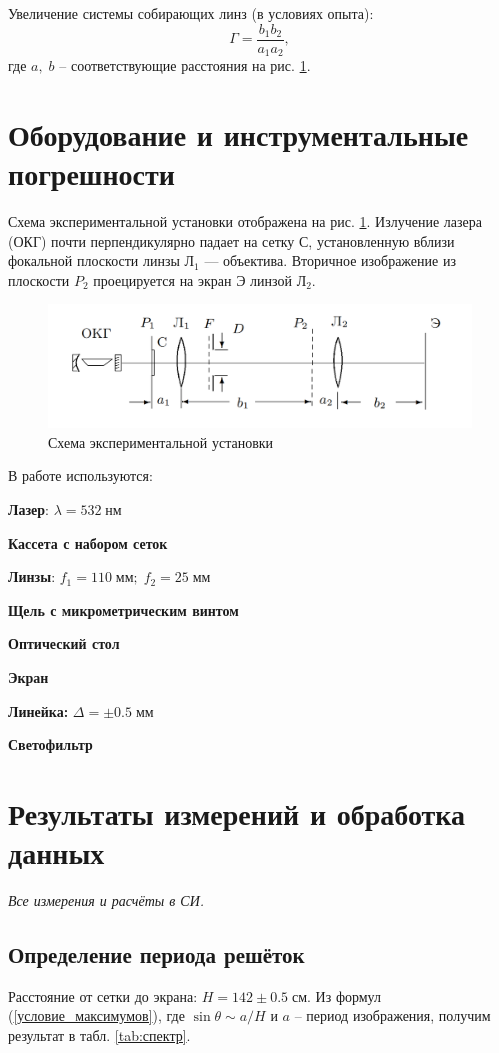 \documentclass[a4paper]{article}
\newcommand{\Equip}[3]{
	
	{\bf #1:} $\Delta = \pm #2\; #3$}
\newcommand{\equip}[1]{
	
	{\bf #1}}
\begin{document}
Увеличение системы собирающих линз (в условиях опыта):
\begin{equation}\label{увеличение}
	\Gamma = \frac{b_1 b_2}{a_1 a_2},
\end{equation}
где $ a, \; b $ -- соответствующие расстояния на рис. \ref{fig:screenshot3}.

\section{Оборудование и инструментальные погрешности}

Схема экспериментальной установки отображена на рис. \ref{fig:screenshot3}. Излучение лазера (ОКГ) почти перпендикулярно падает на сетку С, установленную вблизи фокальной плоскости линзы $ Л_1 $ — объектива. Вторичное изображение из плоскости $ P_2 $ проецируется на экран Э линзой $ Л_2 $.


\begin{figure}[tbp]
	\centering
	\includegraphics[width=0.8\linewidth]{Screenshot_3}
	\caption{Схема экспериментальной установки}
	\label{fig:screenshot3}
\end{figure}

В работе используются:
\equip{Лазер}: $ \lambda = 532 \; нм $
\equip{Кассета с набором сеток}
\equip{Линзы}: $ f_1 = 110 \; мм; \; f_2 = 25\; мм $
\equip{Щель с микрометрическим винтом}
\equip{Оптический стол}
\equip{Экран}
\Equip{Линейка}{0.5}{мм}
\equip{Светофильтр}

\section{Результаты измерений и обработка данных}
\emph{Все измерения и расчёты в СИ.}

\subsection{Определение периода решёток}

Расстояние от сетки до экрана: $ H = 142\pm 0.5 \; см. $ 
Из формул (\ref{условие_максимумов}), где $ \sin \theta \sim a / H $ и $ a $ -- период изображения, получим результат в табл. \ref{tab:спектр}.
\end{document}

